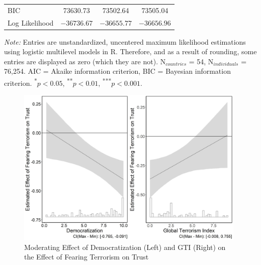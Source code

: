 \begin{table}[H]
{\begin{tabular}{llccc}
\multicolumn{2}{l}{BIC}                     & 73630.73        & 73502.64        & 73505.04        \\
\multicolumn{2}{l}{Log Likelihood}          & $-36736.67$       & $-36655.77$       & $-36656.96$       \\ \hline
\end{tabular}%
}
\vspace{-5mm}
\singlespacing
\footnotesize{\textit{Note:} Entries are unstandardized, uncentered maximum likelihood estimations using logistic multilevel models in R. Therefore, and as a result of rounding, some entries are displayed as zero (which they are not). N$_{countries}$ = 54, N$_{individuals}$ = 76,254. AIC = Akaike information criterion, BIC = Bayesian information criterion. \textsuperscript{*}\(p<0.05\), \textsuperscript{**}\(p<0.01\), \textsuperscript{***}\(p<0.001\).}\par
\end{table}
\newpage


\vspace{3mm}
\begin{figure}[h!]
\centering
\includegraphics[width=0.98\textwidth]{Chapter_2/art1-results2.jpeg}
\caption{Moderating Effect of Democratization (Left) and GTI (Right) on the Effect of Fearing Terrorism on Trust}
\label{fig:art1-results2}    
\end{figure}
\vspace{3mm}

